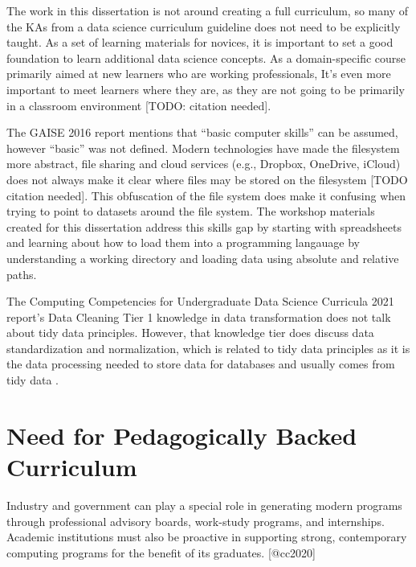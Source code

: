 \documentclass[../main.tex]{subfiles}
\begin{document}
        The work in this dissertation is not around creating a full curriculum,
        so many of the KAs from a data science curriculum guideline does not need to be explicitly taught.
        As a set of learning materials for novices,
        it is important to set a good foundation to learn additional data science concepts.
        As a domain-specific course primarily aimed at new learners who are working professionals,
        It's even more important to meet learners where they are, as they are not going to be primarily in a classroom environment
        [TODO: citation needed].

        The GAISE 2016 report mentions that ``basic computer skills'' can be assumed,
        however ``basic'' was not defined.
        Modern technologies have made the filesystem more abstract,
        file sharing and cloud services (e.g., Dropbox, OneDrive, iCloud) does not always make it clear where files may be stored on the filesystem [TODO citation needed].
        This obfuscation of the file system does make it confusing when trying to point to datasets around the file system.
        The workshop materials created for this dissertation address this skills gap by starting with spreadsheets and learning about how to load them into a programming langauage
        by understanding a working directory and loading data using absolute and relative paths.

        The Computing Competencies for Undergraduate Data Science Curricula 2021 report's
        Data Cleaning Tier 1 knowledge in data transformation does not talk about tidy data principles.
        However, that knowledge tier does discuss data standardization and normalization,
        which is related to tidy data principles as it is the data processing needed to store data for databases and
        usually comes from tidy data
        \cite{wickhamTidyData2014}.

    \section{Need for Pedagogically Backed Curriculum}
    \label{se:intro-curriculum}

    Industry and government can play a special role in generating modern programs through
    professional advisory boards, work-study programs, and internships.
    Academic institutions must also be proactive in
    supporting strong, contemporary computing programs for the benefit of its graduates. [@cc2020]
\end{document}
